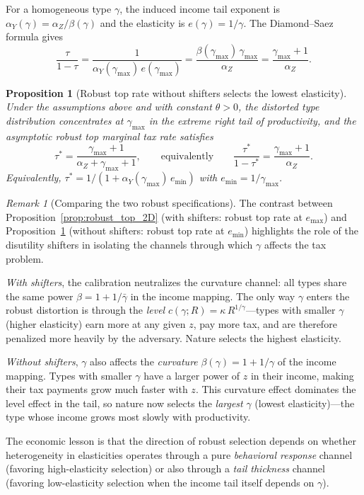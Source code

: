 \documentclass[12pt,a4paper]{article}
\theoremstyle{definition}
\theoremstyle{plain}
\newtheorem{proposition}{Proposition}[section]
\theoremstyle{remark}
\newtheorem{remark}{Remark}[section]
\begin{document}
For a homogeneous type $\gamma$, the induced income tail exponent is $\alpha_Y(\gamma) = \alpha_Z/\beta(\gamma)$ and the elasticity is $e(\gamma) = 1/\gamma$.  The Diamond--Saez formula gives
\[
  \frac{\tau}{1-\tau} = \frac{1}{\alpha_Y(\gamma_{\max})\,e(\gamma_{\max})} = \frac{\beta(\gamma_{\max})\,\gamma_{\max}}{\alpha_Z} = \frac{\gamma_{\max}+1}{\alpha_Z}.
\]

\begin{proposition}[Robust top rate without shifters selects the lowest elasticity]
\label{prop:robust_no_shifter_2D}
Under the assumptions above and with constant $\theta > 0$, the distorted type distribution concentrates at $\gamma_{\max}$ in the extreme right tail of productivity, and the asymptotic robust top marginal tax rate satisfies
\begin{equation}
\label{eq:robust_no_shifters_2D}
  \tau^* = \frac{\gamma_{\max}+1}{\alpha_Z+\gamma_{\max}+1}, \qquad \text{equivalently} \qquad \frac{\tau^*}{1-\tau^*} = \frac{\gamma_{\max}+1}{\alpha_Z}.
\end{equation}
Equivalently, $\tau^* = 1/(1+\alpha_Y(\gamma_{\max})\,e_{\min})$ with $e_{\min} = 1/\gamma_{\max}$.
\end{proposition}

\begin{remark}[Comparing the two robust specifications]
\label{rem:comparing_robust_2D}
The contrast between Proposition~\ref{prop:robust_top_2D} (with shifters: robust top rate at $e_{\max}$) and Proposition~\ref{prop:robust_no_shifter_2D} (without shifters: robust top rate at $e_{\min}$) highlights the role of the disutility shifters in isolating the channels through which $\gamma$ affects the tax problem.

\emph{With shifters}, the calibration neutralizes the curvature channel: all types share the same power $\beta = 1 + 1/\bar\gamma$ in the income mapping.  The only way $\gamma$ enters the robust distortion is through the \emph{level} $c(\gamma;R) = \kappa\,R^{1/\gamma}$---types with smaller $\gamma$ (higher elasticity) earn more at any given $z$, pay more tax, and are therefore penalized more heavily by the adversary.  Nature selects the highest elasticity.

\emph{Without shifters}, $\gamma$ also affects the \emph{curvature} $\beta(\gamma) = 1 + 1/\gamma$ of the income mapping.  Types with smaller $\gamma$ have a larger power of $z$ in their income, making their tax payments grow much faster with $z$.  This curvature effect dominates the level effect in the tail, so nature now selects the \emph{largest} $\gamma$ (lowest elasticity)---the type whose income grows most slowly with productivity.

The economic lesson is that the direction of robust selection depends on whether heterogeneity in elasticities operates through a pure \emph{behavioral response} channel (favoring high-elasticity selection) or also through a \emph{tail thickness} channel (favoring low-elasticity selection when the income tail itself depends on $\gamma$).
\end{remark}
\end{document}

